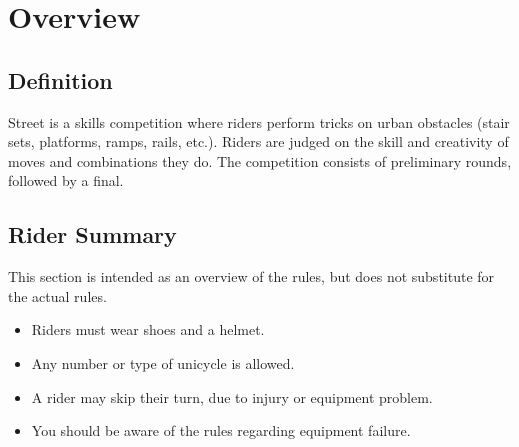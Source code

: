 \chapter{Overview}

\section{Definition}

Street is a skills competition where riders perform tricks on urban obstacles (stair sets, platforms, ramps, rails, etc.).
Riders are judged on the skill and creativity of moves and combinations they do.
The competition consists of preliminary rounds, followed by a final.

\section{Rider Summary}

This section is intended as an overview of the rules, but does not substitute for the actual rules.
\begin{itemize}
\item Riders must wear shoes and a helmet.
\item Any number or type of unicycle is allowed.
\item A rider may skip their turn, due to injury or equipment problem.
\item You should be aware of the rules regarding equipment failure.
\end{itemize}